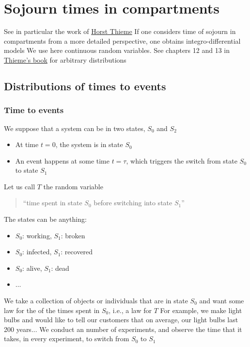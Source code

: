\documentclass[aspectratio=169]{beamer}\usepackage[]{graphicx}\usepackage[]{xcolor}
\begin{document}
\section{Sojourn times in compartments}


\begin{frame}
See in particular the work of \href{https://scholar.google.ca/citations?user=o7R6ZHMAAAAJ}{Horst Thieme}
\vfill
If one considers time of sojourn in compartments from a more detailed perspective, one obtains integro-differential models
\vfill
We use here continuous random variables. See chapters 12 and 13 in \href{https://press.princeton.edu/books/paperback/9780691092911/mathematics-in-population-biology}{Thieme's book} for arbitrary distributions
\end{frame}


\subsection{Distributions of times to events}
\begin{frame}\frametitle{Time to events}
We suppose that a system can be in two states, $S_0$ and $S_2$
\begin{itemize}
\item At time $t=0$, the system is in state $S_0$
\item An event happens at some time $t=\tau$, which triggers the switch from
state $S_0$ to state $S_1$
\end{itemize}
\vfill
Let us call $T$ the random variable 
\begin{quote}
``time spent in state $S_0$ before switching into state $S_1$''
\end{quote}
\end{frame}

\begin{frame}
The states can be anything:
\begin{itemize}
\item $S_0$: working, $S_1$: broken
\item $S_0$: infected, $S_1$: recovered
\item $S_0$: alive, $S_1$: dead
\item $\ldots$
\end{itemize}
\vfill
We take a collection of objects or individuals that are in state $S_0$ and want
some law for the  of the times spent in $S_0$, i.e., a law for $T$
\vfill
For example, we make light bulbs and would like to tell our customers that on average, our light bulbs last 200 years...
\vfill
We conduct an  number of experiments, and observe the time that it takes, in every experiment, to switch from $S_0$ to $S_1$
\end{frame}
\end{document}
